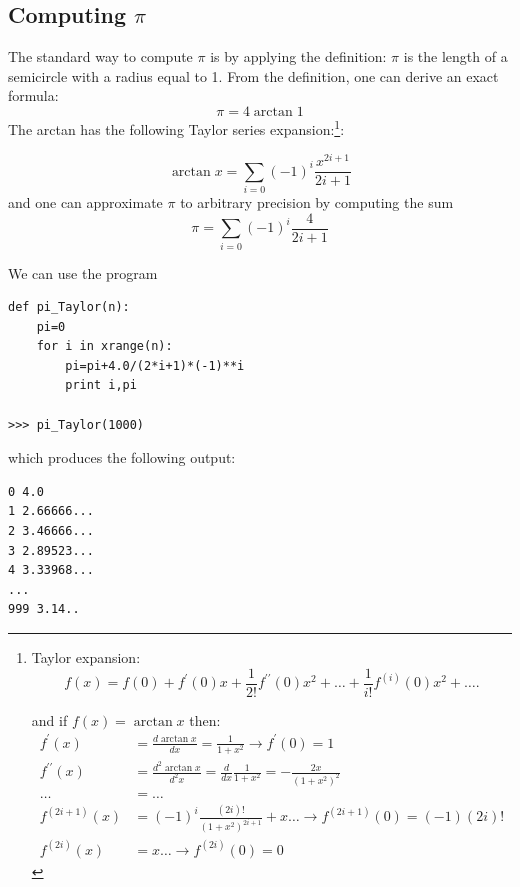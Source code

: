 \documentclass[justified,sixbynine]{tufte-book}
\theoremstyle{plain}%
\theoremstyle{definition}
\theoremstyle{remark}
\begin{document}
\begin{fullwidth}
\goodbreak\subsection{Computing $\pi$}

The standard way to compute $\pi $ is by applying the definition: $\pi $ is
the length of a semicircle with a radius equal to 1. From the definition, one can
derive an exact formula:
\begin{equation}
\pi =4\arctan 1
\end{equation}
The arctan has the following Taylor series expansion:\footnote{%
Taylor expansion:
\begin{equation}
f(x)=f(0)+f^{\prime }(0)x+\frac 1{2!}f^{\prime \prime }(0)x^2+\dots+\frac
1{i!}f^{(i)}(0)x^2+\dots.
\end{equation}
\par
and if $f(x)=\arctan x$ then:
\begin{align}
f^{\prime }(x) &= \frac{d\arctan x}{dx}=\frac 1{1+x^2}\rightarrow f^{\prime
}(0)=1 \\
f^{\prime \prime }(x) &= \frac{d^2\arctan x}{d^2x}=\frac d{dx}\frac
1{1+x^2}=-\frac{2x}{(1+x^2)^2} \\
\dots &= \dots \\
f^{(2i+1)}(x) &= (-1)^i\frac{(2i)!}{(1+x^2)^{2i+1}}+x\dots\rightarrow
f^{(2i+1)}(0)=(-1)(2i)! \\
f^{(2i)}(x) &= x\dots\rightarrow f^{(2i)}(0)=0
\end{align}
}:

\begin{equation}
\arctan x=\allowbreak \sum_{i=0}(-1)^i\frac{x^{2i+1}}{2i+1}
\end{equation}
and one can approximate $\pi $ to arbitrary precision by computing the sum
\begin{equation}
\pi =\allowbreak \sum_{i=0}(-1)^i\frac 4{2i+1}
\end{equation}

We can use the program
\begin{lstlisting}
def pi_Taylor(n):
    pi=0
    for i in xrange(n):
        pi=pi+4.0/(2*i+1)*(-1)**i
        print i,pi

>>> pi_Taylor(1000)
\end{lstlisting}

which produces the following output:
\begin{lstlisting}
0 4.0
1 2.66666...
2 3.46666...
3 2.89523...
4 3.33968...
...
999 3.14..
\end{lstlisting}


\end{fullwidth}
\end{document}
